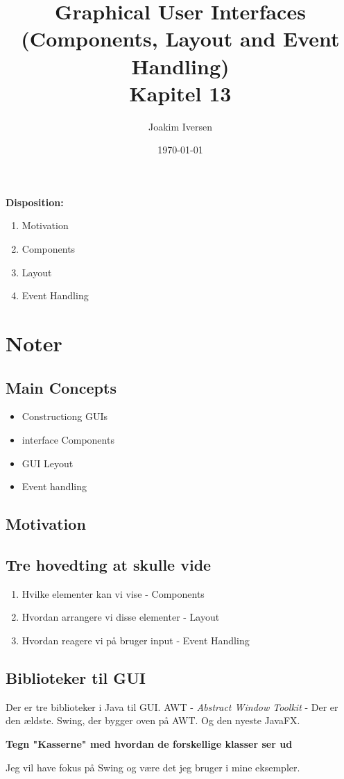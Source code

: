 \documentclass{article}
\title{Graphical User Interfaces (Components, Layout and Event Handling) \\
        Kapitel 13}
\author{Joakim Iversen}
\date{\today}
\begin{document}
\maketitle
\newpage

\textbf{\Large Disposition:}
\begin{enumerate}
    \item Motivation
    \item Components
    \item Layout
    \item Event Handling
\end{enumerate}
\newpage

\section*{Noter}
\subsection*{Main Concepts}
\begin{itemize}
    \item Constructiong GUIs
    \item interface Components
    \item GUI Leyout
    \item Event handling
\end{itemize}

\subsection*{Motivation}

\subsection*{Tre hovedting at skulle vide}
\begin{enumerate}
    \item Hvilke elementer kan vi vise - Components
    \item Hvordan arrangere vi disse elementer - Layout
    \item Hvordan reagere vi på bruger input - Event Handling
\end{enumerate}

\subsection*{Biblioteker til GUI}
Der er tre biblioteker i Java til GUI. AWT - \textit{Abstract Window Toolkit} - Der er den ældste. Swing, der bygger oven på AWT. Og den nyeste JavaFX.
\begin{center}
    \textbf{Tegn "Kasserne" med hvordan de forskellige klasser ser ud}
\end{center}
Jeg vil have fokus på Swing og være det jeg bruger i mine eksempler.
\end{document}
